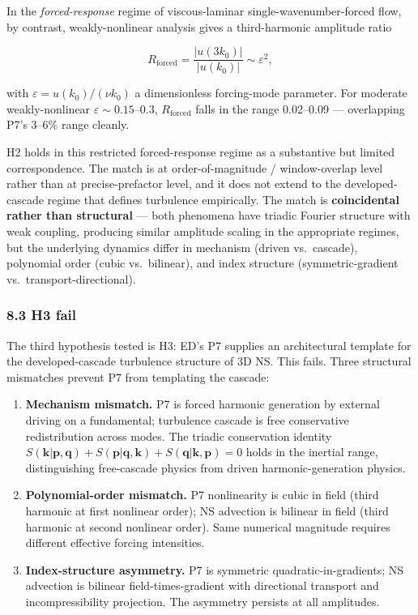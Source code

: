 \documentclass[
]{article}
\begin{document}
In the \emph{forced-response} regime of viscous-laminar
single-wavenumber-forced flow, by contrast, weakly-nonlinear analysis
gives a third-harmonic amplitude ratio

\[R_\mathrm{forced} = \frac{|u(3k_0)|}{|u(k_0)|} \sim \varepsilon^2,\]

with \(\varepsilon = u(k_0)/(\nu k_0)\) a dimensionless forcing-mode
parameter. For moderate weakly-nonlinear
\(\varepsilon \sim 0.15\)--\(0.3\), \(R_\mathrm{forced}\) falls in the
range 0.02--0.09 --- overlapping P7's 3--6\% range cleanly.

H2 holds in this restricted forced-response regime as a substantive but
limited correspondence. The match is at order-of-magnitude /
window-overlap level rather than at precise-prefactor level, and it does
not extend to the developed-cascade regime that defines turbulence
empirically. The match is \textbf{coincidental rather than structural}
--- both phenomena have triadic Fourier structure with weak coupling,
producing similar amplitude scaling in the appropriate regimes, but the
underlying dynamics differ in mechanism (driven vs.~cascade), polynomial
order (cubic vs.~bilinear), and index structure (symmetric-gradient
vs.~transport-directional).

\subsubsection{8.3 H3 fail}\label{h3-fail}

The third hypothesis tested is H3: ED's P7 supplies an architectural
template for the developed-cascade turbulence structure of 3D NS. This
fails. Three structural mismatches prevent P7 from templating the
cascade:

\begin{enumerate}
\def\labelenumi{\arabic{enumi}.}
\item
  \textbf{Mechanism mismatch.} P7 is forced harmonic generation by
  external driving on a fundamental; turbulence cascade is free
  conservative redistribution across modes. The triadic conservation
  identity
  \(S(\mathbf{k}|\mathbf{p},\mathbf{q}) + S(\mathbf{p}|\mathbf{q},\mathbf{k}) + S(\mathbf{q}|\mathbf{k},\mathbf{p}) = 0\)
  holds in the inertial range, distinguishing free-cascade physics from
  driven harmonic-generation physics.
\item
  \textbf{Polynomial-order mismatch.} P7 nonlinearity is cubic in field
  (third harmonic at first nonlinear order); NS advection is bilinear in
  field (third harmonic at second nonlinear order). Same numerical
  magnitude requires different effective forcing intensities.
\item
  \textbf{Index-structure asymmetry.} P7 is symmetric
  quadratic-in-gradients; NS advection is bilinear field-times-gradient
  with directional transport and incompressibility projection. The
  asymmetry persists at all amplitudes.
\end{enumerate}
\end{document}
